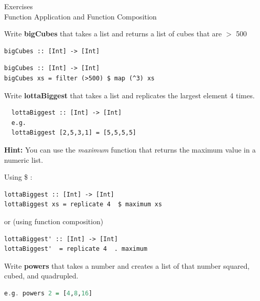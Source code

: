 \documentclass{article}
\newcommand\ExTitle{Function Application and Function Composition}
\newcommand\fullExTitle{Exercises \\ \ExTitle }
\begin{document}
\begin{Huge}
	\begin{center}
	\fullExTitle
	\end{center}
\end{Huge}

\begin{exercise}

Write \textbf{bigCubes} that takes a list and returns a list of cubes that are $>$ 500
\begin{lstlisting}
bigCubes :: [Int] -> [Int]
  \end{lstlisting}
\end{exercise}

\begin{solution}
  \begin{lstlisting}
bigCubes :: [Int] -> [Int]
bigCubes xs = filter (>500) $ map (^3) xs
  \end{lstlisting}
\end{solution}

\begin{exercise} 
  Write \textbf{lottaBiggest} that takes a list and replicates the largest element 4 times. 
  \begin{lstlisting}
  lottaBiggest :: [Int] -> [Int]
  e.g.
  lottaBiggest [2,5,3,1] = [5,5,5,5]
  \end{lstlisting}
  \textbf{Hint:} You can use the \textit{maximum} function that returns the maximum value in a numeric list. 
\end{exercise}

\begin{solution}
  Using \$  :
  \begin{lstlisting}   
lottaBiggest :: [Int] -> [Int]
lottaBiggest xs = replicate 4  $ maximum xs
      \end{lstlisting}

or (using function composition)
\begin{lstlisting}
lottaBiggest' :: [Int] -> [Int]
lottaBiggest'  = replicate 4  . maximum 
          \end{lstlisting}
\end{solution}

\pagebreak
\begin{exercise} 
Write \textbf{powers} that takes a number and creates a list of that number squared, cubed, and quadrupled. 
\begin{lstlisting}[language=Haskell]
e.g. powers 2 = [4,8,16]
  \end{lstlisting}
\end{exercise} 
\end{document}
